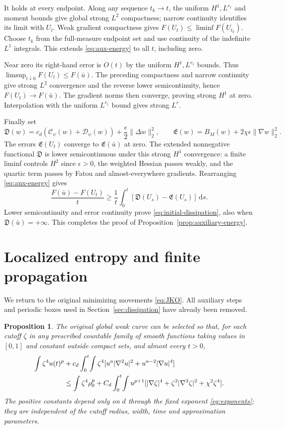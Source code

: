 \documentclass[11pt]{article}
\numberwithin{equation}{section}
\newtheorem{proposition}[theorem]{Proposition}
\theoremstyle{definition}
\theoremstyle{remark}
\newcommand{\dd}{\,\mathrm d}
\newcommand{\norm}[1]{\lVert #1\rVert}
\newcommand{\Cpsi}{\mathcal C_\psi}
\newcommand{\Dpsi}{\mathcal D_\psi}
\begin{document}
It holds at every endpoint. Along any sequence $t_k\to t$, the uniform
$H^1,L^{r_1}$ and moment bounds give global strong $L^2$ compactness;
narrow continuity identifies its limit with $U_t$. Weak gradient
compactness gives $F(U_t)\le\liminf F(U_{t_k})$. Choose $t_k$ from the
full-measure endpoint set and use continuity of the indefinite $L^1$
integrals. This extends \eqref{eq:aux-energy} to all $t$, including zero.

Near zero its right-hand error is $O(t)$ by the uniform $H^1,L^{r_1}$
bounds. Thus $\limsup_{t\downarrow0}F(U_t)\le F(\bar u)$.
The preceding compactness and narrow continuity give strong $L^2$
convergence and the reverse lower semicontinuity, hence $F(U_t)\to F(\bar u)$.
The gradient norms then converge, proving strong $H^1$ at zero.
Interpolation with the uniform $L^{r_1}$ bound gives strong $L^r$.

Finally set
\[
 \mathfrak D(w)=c_d(\Cpsi(w)+\Dpsi(w))
                         +\frac\epsilon2\norm{\Delta w}_2^2,
 \qquad
 \mathfrak E(w)=B_M(w)+2\chi\epsilon\norm{\nabla w}_2^2.
\]
The errors $\mathfrak E(U_t)$ converge to $\mathfrak E(\bar u)$ at zero.
The extended nonnegative functional $\mathfrak D$ is lower semicontinuous
under this strong $H^1$ convergence: a finite liminf controls $H^2$ since
$\epsilon>0$, the weighted Hessian passes weakly, and the quartic term
passes by Fatou and almost-everywhere gradients.
Rearranging \eqref{eq:aux-energy} gives
\[
 \frac{F(\bar u)-F(U_t)}t
       \ge\frac1t\int_0^t[\mathfrak D(U_s)-\mathfrak E(U_s)]\dd s.
\]
Lower semicontinuity and error continuity prove
\eqref{eq:initial-dissipation}, also when $\mathfrak D(\bar u)=+\infty$.
This completes the proof of Proposition~\ref{prop:auxiliary-energy}.
\section{Localized entropy and finite propagation}\label{sec:propagation}

We return to the original minimizing movements \eqref{eq:JKO}. All
auxiliary steps and periodic boxes used in Section~\ref{sec:dissipation}
have already been removed.

\begin{proposition}\label{prop:local-entropy}
The original global weak curve can be selected so that, for each cutoff
$\zeta$ in any prescribed countable family of smooth functions taking
values in $[0,1]$ and constant outside compact sets, and almost every $t>0$,
\begin{align}\label{eq:local-entropy}
 \int\zeta^4u(t)^p
 &+c_d\int_0^t\!\int\zeta^4
       [u^a|\nabla^2u|^2+u^{a-2}|\nabla u|^4]\notag\\
 &\le\int\zeta^4\rho_0^p
 +C_d\int_0^t\!\int u^{p+1}
       [|\nabla\zeta|^4+\zeta^2|\nabla^2\zeta|^2+\chi^2\zeta^4].
\end{align}
The positive constants depend only on $d$ through the fixed exponent
\eqref{eq:exponents}; they are independent of the cutoff radius, width,
time and approximation parameters.
\end{proposition}
\end{document}
